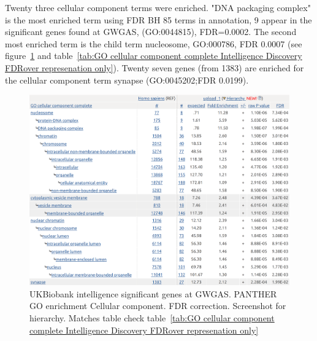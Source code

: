 Twenty three cellular component terms were enriched. "DNA packaging complex" is the most enriched term using FDR BH 85 terms in annotation, 9 appear in the significant genes found at GWGAS, (GO:0044815), FDR=0.0002. The second most enriched term is the child term nucleosome, GO:000786, FDR 0.0007 (see figure~\ref{fig:UKBiobank int significant genes at GWGAS. PANTHER GO enrichment Cellular component. FDR correction. Screenshot for hierarchy} and table~\ref{tab:GO cellular component complete Intelligence Discovery FDRover represenation only}). Twenty seven genes (from 1383) are enriched for the cellular component term synapse (GO:0045202;FDR 0.0199).



\begin{figure}
    \centering
    \includegraphics[width=\textwidth]{images/chapter2/strontium/ukbbint_cc.png}
        \caption{UKBiobank intelligence significant genes at GWGAS. PANTHER GO enrichment Cellular component. FDR correction. Screenshot for hierarchy. Matches table check table~\ref{tab:GO cellular component complete Intelligence Discovery FDRover represenation only} }
    \label{fig:UKBiobank int significant genes at GWGAS. PANTHER GO enrichment Cellular component. FDR correction. Screenshot for hierarchy}
\end{figure}


